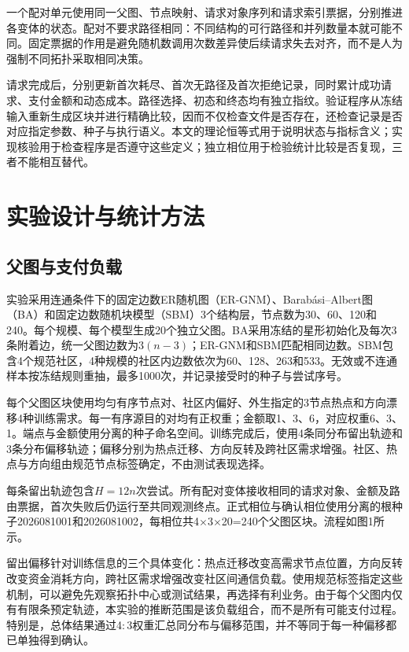 \documentclass[UTF8,a4paper,twocolumn,fontset=none,zihao=5]{ctexart}
\begin{document}
一个配对单元使用同一父图、节点映射、请求对象序列和请求索引票据，分别推进各变体的状态。配对不要求路径相同：不同结构的可行路径和并列数量本就可能不同。固定票据的作用是避免随机数调用次数差异使后续请求失去对齐，而不是人为强制不同拓扑采取相同决策。


请求完成后，分别更新首次耗尽、首次无路径及首次拒绝记录，同时累计成功请求、支付金额和动态成本。路径选择、初态和终态均有独立指纹。验证程序从冻结输入重新生成区块并进行精确比较，因而不仅检查文件是否存在，还检查记录是否对应指定参数、种子与执行语义。本文的理论恒等式用于说明状态与指标含义；实现核验用于检查程序是否遵守这些定义；独立相位用于检验统计比较是否复现，三者不能相互替代。


\section{实验设计与统计方法}

\subsection{父图与支付负载}

实验采用连通条件下的固定边数ER随机图（ER-GNM）、Barabási–Albert图（BA）和固定边数随机块模型（SBM）3个结构层，节点数为30、60、120和240。每个规模、每个模型生成20个独立父图。BA采用冻结的星形初始化及每次3条附着边，统一父图边数为$3(n-3)$；ER-GNM和SBM匹配相同边数。SBM包含4个规范社区，4种规模的社区内边数依次为60、128、263和533。无效或不连通样本按冻结规则重抽，最多1000次，并记录接受时的种子与尝试序号。


每个父图区块使用均匀有序节点对、社区内偏好、外生指定的3节点热点和方向漂移4种训练需求。每一有序源目的对均有正权重；金额取1、3、6，对应权重6、3、1。端点与金额使用分离的种子命名空间。训练完成后，使用4条同分布留出轨迹和3条分布偏移轨迹；偏移分别为热点迁移、方向反转及跨社区需求增强。社区、热点与方向组由规范节点标签确定，不由测试表现选择。


每条留出轨迹包含$H=12n$次尝试。所有配对变体接收相同的请求对象、金额及路由票据，首次失败后仍运行至共同观测终点。正式相位与确认相位使用分离的根种子2026081001和2026081002，每相位共4$\times$3$\times$20=240个父图区块。流程如图1所示。


留出偏移针对训练信息的三个具体变化：热点迁移改变高需求节点位置，方向反转改变资金消耗方向，跨社区需求增强改变社区间通信负载。使用规范标签指定这些机制，可以避免先观察拓扑中心或测试结果，再选择有利业务。由于每个父图内仅有有限条预定轨迹，本实验的推断范围是该负载组合，而不是所有可能支付过程。特别是，总体结果通过4$:$3权重汇总同分布与偏移范围，并不等同于每一种偏移都已单独得到确认。
\end{document}
